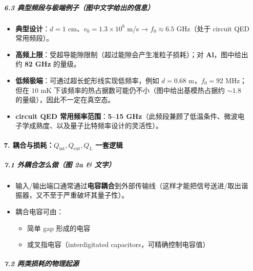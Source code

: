 \documentclass[12pt,a4paper,oneside]{ctexbook}
\providecommand{\tightlist}{%
  \setlength{\itemsep}{0pt}\setlength{\parskip}{0pt}}
\let\oldparagraph\paragraph
\renewcommand{\paragraph}[1]{\oldparagraph{#1}\mbox{}}
\let\oldsubparagraph\subparagraph
\renewcommand{\subparagraph}[1]{\oldsubparagraph{#1}\mbox{}}
\begin{document}
\subparagraph{6.3
典型频段与极端例子（图中文字给出的信息）}\label{ux5178ux578bux9891ux6bb5ux4e0eux6781ux7aefux4f8bux5b50ux56feux4e2dux6587ux5b57ux7ed9ux51faux7684ux4fe1ux606f}

\begin{itemize}
\tightlist
\item
  \textbf{典型设计}：\(d=1\) cm、\(v_0=1.3\times10^8\) m/s →
  \(f_0\approx 6.5\) GHz（处于 circuit QED 常用频段）。
\item
  \textbf{高频上限}：受超导能隙限制（超过能隙会产生准粒子损耗）；对
  \textbf{Al}，图中给出约 \textbf{82 GHz} 的量级。
\item
  \textbf{低频极端}：可通过超长蛇形线实现低频率，例如 \(d=0.68\)
  m，\(f_0=92\) MHz；但在 \(10\) mK
  下该频率的热占据数可能仍不小（图中给出基模热占据约 \(\sim 1.8\)
  的量级），因此不一定在真空态。
\item
  \textbf{circuit QED 常用频率范围}：\textbf{5--15
  GHz}（此频段兼顾了低温条件、微波电子学成熟度、以及量子比特频率设计的灵活性）。
\end{itemize}


\paragraph{\texorpdfstring{7.
耦合与损耗：\(Q_{\text{int}}, Q_{\text{ext}}, Q_L\)
一套逻辑}{7. 耦合与损耗：Q\_\{\textbackslash{}text\{int\}\}, Q\_\{\textbackslash{}text\{ext\}\}, Q\_L 一套逻辑}}\label{ux8026ux5408ux4e0eux635fux8017q_textint-q_textext-q_l-ux4e00ux5957ux903bux8f91}

\subparagraph{7.1 外耦合怎么做（图 2a \&
文字）}\label{ux5916ux8026ux5408ux600eux4e48ux505aux56fe-2a-ux6587ux5b57}

\begin{itemize}
\tightlist
\item
  输入/输出端口通常通过\textbf{电容耦合}到外部传输线（这样才能把信号送进/取出谐振器，又不至于严重破坏其量子性）。
\item
  耦合电容可由：

  \begin{itemize}
  \tightlist
  \item
    简单 gap 形成的电容
  \item
    或叉指电容（interdigitated capacitors，可精确控制电容值）
  \end{itemize}
\end{itemize}

\subparagraph{7.2
两类损耗的物理起源}\label{ux4e24ux7c7bux635fux8017ux7684ux7269ux7406ux8d77ux6e90}
\end{document}
